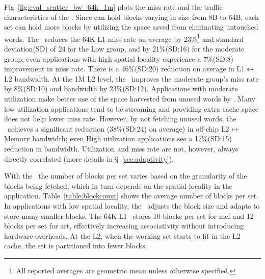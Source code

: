 {Fig~\ref{fig:eval_scatter_bw_64k_1m} plots the miss rate and the traffic characteristics of the \AC{}.  Since \AC{} can hold blocks varying in size from 8B to 64B, each set can hold more blocks by utilizing the space saved from eliminating untouched words. The \AC\ reduces the 64K L1 miss rate on average by 23\%\footnote{All reported averages are geometric mean unless otherwise specified.} and standard deviation(SD) of 24 for the Low group, and by 21\%(SD:16) for the moderate group; even applications with high spatial locality experience a 7\%(SD:8) improvement in miss rate. There is a 46\%(SD:20) reduction on average in L1$\leftrightarrow$L2 bandwidth. At the 1M L2 level, the \AC\ improves the moderate group's miss rate by 8\%(SD:10) and bandwidth by 23\%(SD:12).  Applications with moderate utilization make better use of the space harvested from unused words by \AC{}. Many low utilization applications tend to be streaming and providing extra cache space does not help lower miss rate. However, by not fetching unused words, the \AC\ achieves a significant reduction (38\%(SD:24) on average) in off-chip L2$\leftrightarrow$Memory bandwidth; even High utilization applications see a 17\%(SD:15) reduction in bandwidth.  Utilization and miss rate are not, however, always directly correlated (more details in \S~\ref{sec:adaptivity}).

With the \AC\, the number of blocks per set varies based on the granularity of the blocks being fetched, which in turn depends on the spatial locality in the application. Table~\ref{table:blockcount} shows the average number of blocks per set. In applications with low spatial locality, the \AC\ adjusts the block size and adapts to store many smaller blocks. The 64K L1 \AC\ stores 10 blocks per set for mcf and 12 blocks per set for art, effectively increasing associativity without introducing hardware overheads. At the L2, when the working set starts to fit in the L2 cache, the set is partitioned into fewer blocks. 

\begin{figure}[ht]

  

\end{figure}}
